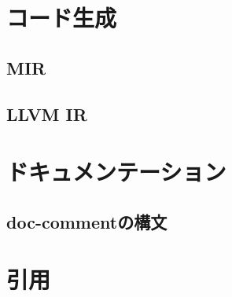 \documentclass[dvipdfmx,uplatex,papersize,a4paper,10pt]{jsbook}
\theoremstyle{definition}
\begin{document}
\chapter{コード生成}

\section{MIR}

\section{LLVM IR}



\chapter{ドキュメンテーション}

\section{doc-commentの構文}



\chapter{引用}



\end{document}

